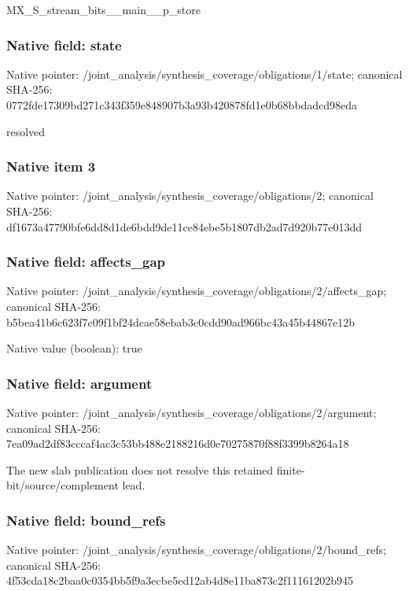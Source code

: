 \documentclass[10pt,a4paper]{article}
\begin{document}
\begingroup\raggedright\sloppy MX\_\allowbreak{}S\_\allowbreak{}stream\_\allowbreak{}bits\_\allowbreak{}\_\allowbreak{}main\_\allowbreak{}\_\allowbreak{}p\_\allowbreak{}store\par\endgroup

\subsubsection{Native field: state}
Native pointer: /joint\_\allowbreak{}analysis/synthesis\_\allowbreak{}coverage/obligations/1/state; canonical SHA-256: 0772fde17309bd271c343f359e848907b3a93b420878fd1e0b68bbdadcd98eda

\begingroup\raggedright\sloppy resolved\par\endgroup

\subsubsection{Native item 3}
Native pointer: /joint\_\allowbreak{}analysis/synthesis\_\allowbreak{}coverage/obligations/2; canonical SHA-256: df1673a47790bfe6dd8d1de6bdd9de11ce84ebe5b1807db2ad7d920b77e013dd

\subsubsection{Native field: affects\_\allowbreak{}gap}
Native pointer: /joint\_\allowbreak{}analysis/synthesis\_\allowbreak{}coverage/obligations/2/affects\_\allowbreak{}gap; canonical SHA-256: b5bea41b6c623f7c09f1bf24dcae58ebab3c0cdd90ad966bc43a45b44867e12b

Native value (boolean): true

\subsubsection{Native field: argument}
Native pointer: /joint\_\allowbreak{}analysis/synthesis\_\allowbreak{}coverage/obligations/2/argument; canonical SHA-256: 7ea09ad2df83cccaf4ac3c53bb488e2188216d0e70275870f88f3399b8264a18

\begingroup\raggedright\sloppy The new slab publication does not resolve this retained finite-bit/\allowbreak{}source/\allowbreak{}complement lead.\par\endgroup

\subsubsection{Native field: bound\_\allowbreak{}refs}
Native pointer: /joint\_\allowbreak{}analysis/synthesis\_\allowbreak{}coverage/obligations/2/bound\_\allowbreak{}refs; canonical SHA-256: 4f53cda18c2baa0c0354bb5f9a3ecbe5ed12ab4d8e11ba873c2f11161202b945
\end{document}
